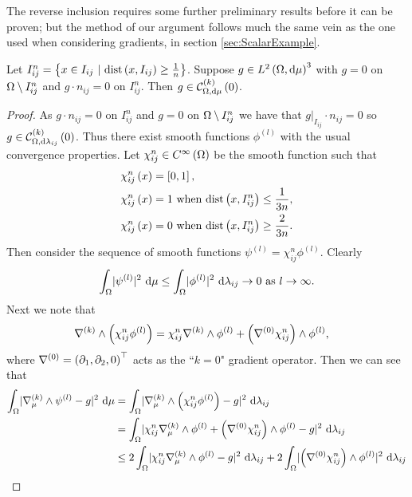 The reverse inclusion requires some further preliminary results before it can be proven; but the method of our argument follows much the same vein as the one used when considering gradients, in section \ref{sec:ScalarExample}.
\begin{lemma} \label{lem:SegkCurlExtend}
	Let $I_{ij}^n=\clbracs{ x\in I_{ij} \ \vert \ \mathrm{dist}\bracs{x,I_{ij}}\geq\recip{n} }$.
	Suppose $g\in L^{2}\left( \Omega,\mathrm{d}\mu \right)^3$ with $g=0$ on $\Omega\setminus I_{ij}^n$ and $g\cdot n_{ij}=0$ on $I_{ij}^n$.
	Then $g\in\mathcal{C}_{ \Omega, \mathrm{d}\mu}^{(k)}\left( 0 \right)$.
\end{lemma}
\begin{proof}
	As $g\cdot n_{ij}=0$ on $I_{ij}^n$ and $g=0$ on $\Omega\setminus I_{ij}^n$ we have that $g\vert_{I_{ij}}\cdot n_{ij}=0$ so $g\in\mathcal{C}_{ \Omega, \mathrm{d}\lambda_{ij}}^{(k)}\left( 0 \right)$.
	Thus there exist smooth functions $\phi^{(l)}$ with the usual convergence properties.
	Let $\chi_{ij}^n\in C^{\infty}\left( \Omega \right)$ be the smooth function such that
	\begin{align*}
		\chi_{ij}^n\left( x \right) &= \left[ 0,1 \right], \\
		\chi_{ij}^n\left( x \right) &= 1 \text{ when } \mathrm{dist}\left( x,I_{ij}^n \right)\leq \frac{1}{3n}, \\
		\chi_{ij}^n\left( x \right) &= 0 \text{ when } \mathrm{dist}\left( x,I_{ij}^n \right)\geq\frac{2}{3n}.
	\end{align*}
	Then consider the sequence of smooth functions $\psi^{(l)}=\chi_{ij}^n\phi^{(l)}$.
	Clearly
	\begin{align*}
		\int_{\Omega}\lvert \psi^{(l)} \rvert^2 \ \mathrm{d}\mu \leq \int_{\Omega}\lvert \phi^{(l)} \rvert^2 \ \mathrm{d}\lambda_{ij} \rightarrow0 \ \text{as} \ l \rightarrow\infty.
	\end{align*}
	Next we note that
	\begin{align*}
		\nabla_{}^{(k)}\wedge\left( \chi_{ij}^n\phi^{(l)} \right) &= \chi_{ij}^n\nabla_{}^{(k)}\wedge\phi^{(l)} + \left( \nabla^{(0)}\chi_{ij}^n \right)\wedge\phi^{(l)},
	\end{align*}
	where $\nabla^{(0)}=\left( \partial_1, \partial_2, 0 \right)^\top$ acts as the ``$k=0$" gradient operator.
	Then we can see that
	\begin{align*}
		\integral{\ddom}{\abs{\kcurl{\ddmes}\psi^{(l)} - g}^2}{\ddmes}
		&= \integral{\ddom}{\abs{\kcurl{\ddmes}\bracs{\chi_{ij}^n\phi^{(l)}} - g}^2}{\lambda_{ij}} \\
		&= \integral{\ddom}{\abs{\chi_{ij}^n\kcurl{\ddmes}\phi^{(l)} + \bracs{\grad^{(0)}\chi_{ij}^n}\wedge\phi^{(l)} - g}^2}{\lambda_{ij}} \\
		&\leq 2\integral{\ddom}{\abs{\chi_{ij}^n\kcurl{\ddmes}\phi^{(l)} - g}^2}{\lambda_{ij}} + 2\integral{\ddom}{\abs{\bracs{\grad^{(0)}\chi_{ij}^n}\wedge\phi^{(l)}}^2}{\lambda_{ij}} \\

\end{align*}
\end{proof}
